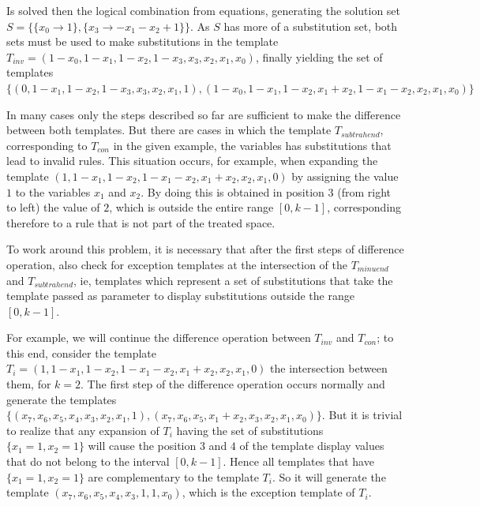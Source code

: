 \documentclass[12pt, a4paper]{article}
\begin{document}
Is solved then the logical combination from equations, generating the solution set $S = \{\{x_0\to 1\},\{x_3\to -x_1-x_2+1\}\}$. As $S$ has more of a substitution set, both sets must be used to make substitutions in the template $T_{inv} = (1 - x_0, 1 - x_1, 1 - x_2, 1 - x_3, x_3, x_2, x_1, x_0)$, finally yielding the set of templates $\{(0, 1 - x_1, 1 - x_2, 1 - x_3, x_3, x_2, x_1, 1),(1 - x_0, 1 - x_1, 1 - x_2, x_1 + x_2, 1 - x_1 - x_2, x_2, x_1, x_0)\}$

In many cases only the steps described so far are sufficient to make the difference between both templates. But there are cases in which the template $T_{subtrahend}$, corresponding to $T_{con}$ in the given example, the variables has substitutions that lead to invalid rules. This situation occurs, for example, when expanding the template $(1, 1 - x_1, 1 - x_2, 1 - x_1 - x_2, x_1 + x_2, x_2, x_1, 0)$ by assigning the value $1$ to the variables $x_1$ and $x_2$. By doing this is obtained in position $3$ (from right to left) the value of $2$, which is outside the entire range $[0, k-1]$, corresponding therefore to a rule that is not part of the treated space.

To work around this problem, it is necessary that after the first steps of difference operation, also check for exception templates at the intersection of the $T_{minuend}$ and $T_{subtrahend}$, ie, templates which represent a set of substitutions that take the template passed as parameter to display  substitutions outside the range $[0,k-1]$. %

For example, we will continue the difference operation between $T_{inv}$ and $T_{con}$; to this end, consider the template $T_i = (1, 1 - x_1, 1 - x_2, 1 - x_1 - x_2, x_1 + x_2, x_2, x_1, 0)$ the intersection between them, for $k=2$.
The first step of the difference operation occurs normally and generate the templates $\{(x_7, x_6, x_5, x_4, x_3, x_2, x_1, 1),(x_7, x_6, x_5, x_1 + x_2, x_3, x_2, x_1, x_0)\}$.
But it is trivial to realize that any expansion of $T_i$ having the set of substitutions $\{x_1 = 1, x_2 = 1\}$ will cause the position $3$ and $4$ of the template display values that do not belong to the interval $[0,k-1]$.
Hence all templates that have $\{x_1 = 1, x_2 = 1\}$ are complementary to the template $T_i$. So it will generate the template $(x_7, x_6, x_5, x_4, x_3, 1, 1, x_0)$, which is the exception template of $T_i$.
\end{document}
